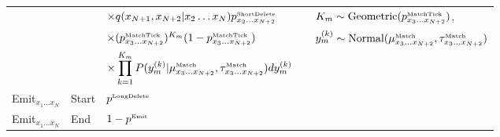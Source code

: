 \documentclass[10pt]{article}
\begin{document}
\begin{tabular}{lllll}
& & $\times q(x_{N+1},x_{N+2}|x_2\ldots x_N) p^{\mbox{\tiny ShortDelete}}_{x_2\ldots x_{N+2}}$ & & $K_m \sim \mbox{Geometric}(p^{\mbox{\tiny MatchTick}}_{x_3\ldots x_{N+2}})$, \\
& & $\times (p^{\mbox{\tiny MatchTick}}_{x_3\ldots x_{N+2}})^{K_m} (1-p^{\mbox{\tiny MatchTick}}_{x_3\ldots x_{N+2}})$ & & $y_m^{(k)} \sim \mbox{Normal}(\mu^{\mbox{\tiny Match}}_{x_3\ldots x_{N+2}},\tau^{\mbox{\tiny Match}}_{x_3\ldots x_{N+2}})$ \\
& & $\times \displaystyle \prod_{k=1}^{K_m} P(y^{(k)}_m|\mu^{\mbox{\tiny Match}}_{x_3\ldots x_{N+2}},\tau^{\mbox{\tiny Match}}_{x_3\ldots x_{N+2}}) dy^{(k)}_m$ \\
Emit${}_{x_1 \ldots x_N}$ & Start & $p^{\mbox{\tiny LongDelete}}$ & & \\
Emit${}_{x_1 \ldots x_N}$ & End & $1 - p^{\mbox{\tiny Emit}}$ & & \\
\hline
\end{tabular}

\normalsize
\restoregeometry
\end{document}
